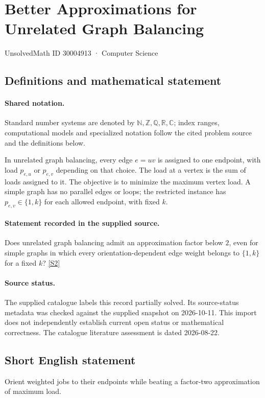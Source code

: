 \documentclass[11pt]{article}
\newcommand{\sref}[2]{\hyperlink{source:#1:#2}{[S#2]}}
\begin{document}
\setcounter{section}{30004912}
\section{Better Approximations for Unrelated Graph Balancing}\label{30004913}
{\small\sffamily UnsolvedMath ID 30004913 · Computer Science}
\subsection{Definitions and mathematical statement}

\paragraph{Shared notation.}Standard number systems are denoted by $\mathbb N,\mathbb Z,\mathbb Q,\mathbb R,\mathbb C$; index ranges, computational models and specialized notation follow the cited problem source and the definitions below.


In unrelated graph balancing, every edge $e=uv$ is assigned to one endpoint, with load $p_{e,u}$ or $p_{e,v}$ depending on that choice. The load at a vertex is the sum of loads assigned to it. The objective is to minimize the maximum vertex load. A simple graph has no parallel edges or loops; the restricted instance has $p_{e,v}\in\{1,k\}$ for each allowed endpoint, with fixed $k$.
\paragraph{Statement recorded in the supplied source.}
Does unrelated graph balancing admit an approximation factor below $2$, even for simple graphs in which every orientation-dependent edge weight belongs to $\{1,k\}$ for a fixed $k$? \sref{30004913}{2}
\paragraph{Source status.}
The supplied catalogue labels this record partially solved. Its source-status metadata was checked against the supplied snapshot on 2026-10-11. This import does not independently establish current open status or mathematical correctness. The catalogue literature assessment is dated 2026-08-22.
\subsection{Short English statement}
Orient weighted jobs to their endpoints while beating a factor-two approximation of maximum load.
\end{document}
